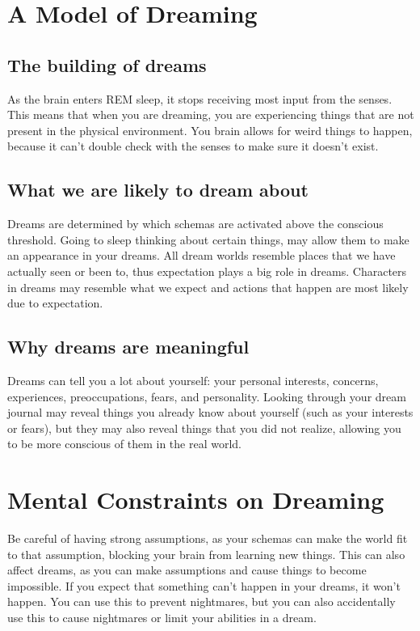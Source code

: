 \documentclass{book}
\begin{document}
\section{A Model of Dreaming}
\subsection{The building of dreams}
As the brain enters REM sleep, it stops receiving most input from the senses. This means that when you are dreaming, you are experiencing things that are not present in the physical environment. You brain allows for weird things to happen, because it can't double check with the senses to make sure it doesn't exist. 

\subsection{What we are likely to dream about}
Dreams are determined by which schemas are activated above the conscious threshold. Going to sleep thinking about certain things, may allow them to make an appearance in your dreams. All dream worlds resemble places that we have actually seen or been to, thus expectation plays a big role in dreams. Characters in dreams may resemble what we expect and actions that happen are most likely due to expectation. 

\subsection{Why dreams are meaningful}
Dreams can tell you a lot about yourself: your personal interests, concerns, experiences, preoccupations, fears, and personality. Looking through your dream journal may reveal things you already know about yourself (such as your interests or fears), but they may also reveal things that you did not realize, allowing you to be more conscious of them in the real world.

\section{Mental Constraints on Dreaming} 
Be careful of having strong assumptions, as your schemas can make the world fit to that assumption, blocking your brain from learning new things. This can also affect dreams, as you can make assumptions and cause things to become impossible. If you expect that something can't happen in your dreams, it won't happen. You can use this to prevent nightmares, but you can also accidentally use this to cause nightmares or limit your abilities in a dream.
\end{document}
